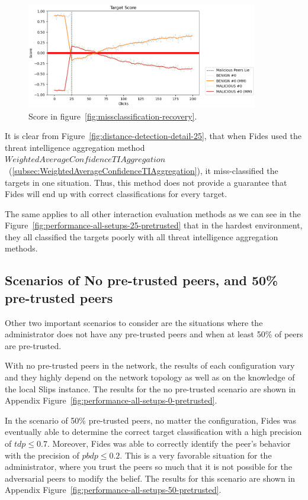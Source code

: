 \begin{figure}[ht]
    \centering
    \includegraphics[width=0.9\textwidth]{assets/misclassification_score.png}
    \caption{Score in figure~\ref{fig:missclassification-recovery}.}
    \label{fig:missclassification-score-only}
\end{figure}

It is clear from Figure~\ref{fig:distance-detection-detail-25}, that when Fides used the threat intelligence aggregation method $WeightedAverageConfidenceTIAggregation$~(\ref{subsec:WeightedAverageConfidenceTIAggregation}), it miss-classified the targets in one situation.
Thus, this method does not provide a guarantee that Fides will end up with correct classifications for every target.

The same applies to all other interaction evaluation methods as we can see in the Figure~\ref{fig:performance-all-setups-25-pretrusted} that in the hardest environment, they all classified the targets poorly with all threat intelligence aggregation methods.

\subsection{Scenarios of No pre-trusted peers, and 50\% pre-trusted peers}
\label{subsec:resilience-under-different-conditions}
Other two important scenarios to consider are the situations where the administrator does not have any pre-trusted peers and when at least 50\% of peers are pre-trusted.

With no pre-trusted peers in the network, the results of each configuration vary and they highly depend on the network topology as well as on the knowledge of the local Slips instance. The results for the no pre-trusted scenario are shown in Appendix Figure~\ref{fig:performance-all-setups-0-pretrusted}.


In the scenario of 50\% pre-trusted peers, no matter the configuration, Fides was eventually able to determine the correct target classification with a high precision of $tdp \leq 0.7$. Moreover, Fides was able to correctly identify the peer's behavior with the precision of $pbdp \leq 0.2$. This is a very favorable situation for the administrator, where you trust the peers so much that it is not possible for the adversarial peers to modify the belief. The results for this scenario are shown in Appendix Figure~\ref{fig:performance-all-setups-50-pretrusted}.

